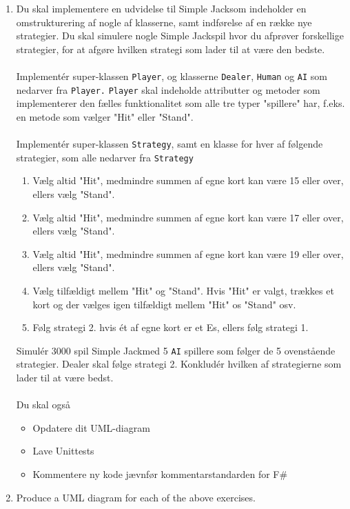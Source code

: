 \documentclass[a4paper,12pt]{article}
\newcommand{\sbl}{Simple Jack}
\begin{document}
\begin{enumerate}[label=10ø.\arabic*,start=0]
\item Du skal implementere en udvidelse til \sbl som indeholder en omstrukturering af nogle af klasserne, samt indførelse af en række nye strategier. Du skal simulere nogle \sbl spil hvor du afprøver forskellige strategier, for at afgøre
  hvilken strategi som lader til at være den bedste. \\ \\
  Implement\'{e}r super-klassen \texttt{Player}, og klasserne \texttt{Dealer}, \texttt{Human} og \texttt{AI} som nedarver fra \texttt{Player.} \texttt{Player} skal indeholde attributter og metoder som implementerer den fælles funktionalitet
  som alle tre typer "spillere" har, f.eks. en metode som vælger "Hit" eller "Stand". \\ \\
  Implement\'{e}r super-klassen \texttt{Strategy}, samt en klasse for hver af følgende strategier, som alle nedarver fra \texttt{Strategy}
  \begin{enumerate}
  \item Vælg altid "Hit", medmindre summen af egne kort kan være 15 eller over, ellers vælg "Stand".
  \item Vælg altid "Hit", medmindre summen af egne kort kan være 17 eller over, ellers vælg "Stand".
  \item Vælg altid "Hit", medmindre summen af egne kort kan være 19 eller over, ellers vælg "Stand".
  \item Vælg tilfældigt mellem "Hit" og "Stand". Hvis "Hit" er valgt, trækkes et kort og der vælges igen tilfældigt mellem
    "Hit" os "Stand" osv.
  \item Følg strategi 2. hvis \'{e}t af egne kort er et Es, ellers følg strategi 1.
  \end{enumerate}
  Simul\'{e}r 3000 spil \sbl med 5 \texttt{AI} spillere som følger de 5 ovenstående strategier.
  Dealer skal følge strategi 2. 
  Konklud\'{e}r hvilken af strategierne som lader til at være bedst. \\ \\
  Du skal også
  \begin{itemize}
  \item Opdatere dit UML-diagram
  \item Lave Unittests
  \item Kommentere ny kode jævnfør kommentarstandarden for F\#
  \end{itemize}
  
\item Produce a UML diagram for each of the above exercises.
  
\end{enumerate}
\end{document}
